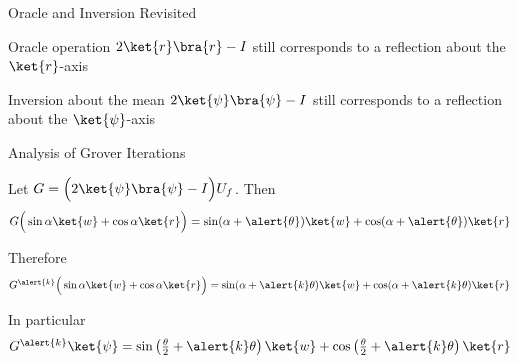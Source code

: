 \documentclass{beamer}
\begin{document}
\begin{frame}{Oracle and Inversion Revisited}

        Oracle operation $2\ket{r}\bra{r} - I$ still corresponds to a
        reflection about the $\ket{r}$-axis

        \pause
        Inversion about the mean $2\ket{\psi}\bra{\psi} - I$ still
        corresponds to a reflection about the $\ket{\psi}$-axis

\end{frame}

\begin{frame}{Analysis of Grover Iterations}

                Let $G = \Big (2 \ket{\psi} \bra{\psi} - I \Big ) U_f$. Then
                \[
                        G \Big (\sin \alpha \ket{w} + \cos \alpha \ket{r} \Big )
                        = \textstyle{
                        \sin (\alpha + \alert{\theta}) \ket{w} + 
                        \cos (\alpha + \alert{\theta}) \ket{r}}
                \]

                \vfill
                Therefore
                \[
                       \textstyle{
                        G^{\alert{k}} \Big (\sin \alpha \ket{w} + 
                        \cos \alpha \ket{r} \Big )} =
                        \textstyle{
                        \sin (\alpha + \alert{k} \theta) \ket{w} + 
                        \cos (\alpha + \alert{k} \theta) \ket{r}
                        } 
                \]

                \vfill
                In particular
                \[
                       \textstyle{
                       G^{\alert{k}} \ket{\psi} }  = 
                       \textstyle{
                        \sin \left (\frac{\theta}{2} + \alert{k} \theta \right ) \ket{w} + 
                        \cos \left  (\frac{\theta}{2} + \alert{k} \theta \right ) \ket{r}
                        } 
                \]
\end{frame}
\end{document}
